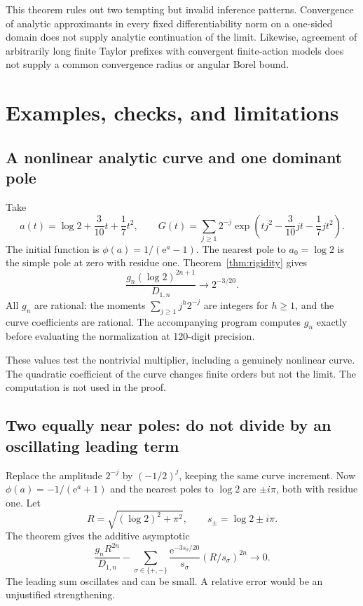 \documentclass[11pt,a4paper]{article}
\numberwithin{equation}{section}
\theoremstyle{definition}
\theoremstyle{remark}
\newcommand{\ee}{\mathrm e}
\begin{document}
This theorem rules out two tempting but invalid inference patterns.
Convergence of analytic approximants in every fixed differentiability
norm on a one-sided domain does not supply analytic continuation of the
limit.  Likewise, agreement of arbitrarily long finite Taylor prefixes
with convergent finite-action models does not supply a common convergence
radius or angular Borel bound.

\section{Examples, checks, and limitations}
\label{sec:examples}

\subsection{A nonlinear analytic curve and one dominant pole}
Take
\[
 a(t)=\log2+\frac3{10}t+\frac17t^2,
 \qquad
 G(t)=\sum_{j\ge1}2^{-j}
          \exp\left(tj^2-\frac3{10}jt-\frac17jt^2\right).
\]
The initial function is $\phi(a)=1/(\ee^a-1)$.
The nearest pole to $a_0=\log2$ is the simple pole at zero with residue
one.  Theorem~\ref{thm:rigidity} gives
\begin{equation}
 \frac{g_n(\log2)^{2n+1}}{D_{1,n}}
       \longrightarrow2^{-3/20}.
 \label{eq:heat-check-limit}
\end{equation}
All $g_n$ are rational: the moments
$\sum_{j\ge1}j^h2^{-j}$ are integers for $h\ge1$, and the curve
coefficients are rational.  The accompanying program computes $g_n$
exactly before evaluating the normalization at 120-digit precision.

\begin{center}

\end{center}

These values test the nontrivial multiplier, including a genuinely
nonlinear curve.  The quadratic coefficient of the curve changes finite
orders but not the limit.  The computation is not used in the proof.

\subsection{Two equally near poles: do not divide by an oscillating leading term}
Replace the amplitude $2^{-j}$ by $(-1/2)^j$, keeping the same curve
increment.  Now $\phi(a)=-1/(\ee^a+1)$ and the nearest poles to
$\log2$ are $\pm i\pi$, both with residue one.  Let
\[
 R=\sqrt{(\log2)^2+\pi^2},\qquad s_\pm=\log2\pm i\pi.
\]
The theorem gives the additive asymptotic
\begin{equation}
 \frac{g_nR^{2n}}{D_{1,n}}
   -\sum_{\sigma\in\{+,-\}}
      \frac{\ee^{-3s_\sigma/20}}{s_\sigma}
                (R/s_\sigma)^{2n}\longrightarrow0.
 \label{eq:two-pole-check}
\end{equation}
The leading sum oscillates and can be small.  A relative error would be
an unjustified strengthening.
\end{document}

